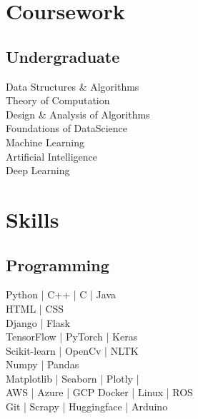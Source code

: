 \documentclass[letterpaper]{deedy-resume} %
\begin{document}
\begin{minipage}[t]{0.33\textwidth}


\vspace{-2.00mm}

\section{Coursework}


\subsection{Undergraduate}

\textbullet{} Data Structures \& Algorithms \\
\textbullet{} Theory of Computation \\
\textbullet{} Design \& Analysis of Algorithms\\
\textbullet{} Foundations of DataScience \\
\textbullet{} Machine Learning \\
\textbullet{} Artificial Intelligence \\
\textbullet{} Deep Learning \\

\sectionspace %

 \vspace{-2.5mm}

\section{Skills}

\subsection{Programming}

Python | C++ | C | Java  \\ 
HTML | CSS \\ \hspace{1.3mm} Django | Flask \\
TensorFlow | PyTorch | Keras \\ \hspace{1.3mm} Scikit-learn | OpenCv | NLTK\\
Numpy | Pandas \\ \hspace{1.3mm} Matplotlib | Seaborn | Plotly | \\
AWS | Azure | GCP 
Docker | Linux | ROS \\ \hspace{1.3mm} Git | Scrapy | Huggingface | Arduino


\end{minipage}
\end{document}

